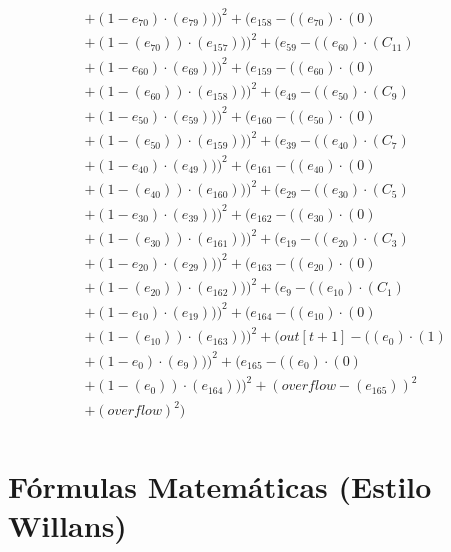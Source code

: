 \documentclass[10pt, a4paper]{article}
\begin{document}
\begin{small}
\begin{align*}
& + (1 - e_{70})  \cdot  (e_{79})))^{2} + (e_{158} - ((e_{70}) \cdot (0) \\
& + (1 - (e_{70})) \cdot (e_{157})))^{2} + (e_{59} - ((e_{60})  \cdot  (C_{11}) \\
& + (1 - e_{60})  \cdot  (e_{69})))^{2} + (e_{159} - ((e_{60}) \cdot (0) \\
& + (1 - (e_{60})) \cdot (e_{158})))^{2} + (e_{49} - ((e_{50})  \cdot  (C_{9}) \\
& + (1 - e_{50})  \cdot  (e_{59})))^{2} + (e_{160} - ((e_{50}) \cdot (0) \\
& + (1 - (e_{50})) \cdot (e_{159})))^{2} + (e_{39} - ((e_{40})  \cdot  (C_{7}) \\
& + (1 - e_{40})  \cdot  (e_{49})))^{2} + (e_{161} - ((e_{40}) \cdot (0) \\
& + (1 - (e_{40})) \cdot (e_{160})))^{2} + (e_{29} - ((e_{30})  \cdot  (C_{5}) \\
& + (1 - e_{30})  \cdot  (e_{39})))^{2} + (e_{162} - ((e_{30}) \cdot (0) \\
& + (1 - (e_{30})) \cdot (e_{161})))^{2} + (e_{19} - ((e_{20})  \cdot  (C_{3}) \\
& + (1 - e_{20})  \cdot  (e_{29})))^{2} + (e_{163} - ((e_{20}) \cdot (0) \\
& + (1 - (e_{20})) \cdot (e_{162})))^{2} + (e_{9} - ((e_{10})  \cdot  (C_{1}) \\
& + (1 - e_{10})  \cdot  (e_{19})))^{2} + (e_{164} - ((e_{10}) \cdot (0) \\
& + (1 - (e_{10})) \cdot (e_{163})))^{2} + (out[t+1] - ((e_{0})  \cdot  (1) \\
& + (1 - e_{0})  \cdot  (e_{9})))^{2} + (e_{165} - ((e_{0}) \cdot (0) \\
& + (1 - (e_{0})) \cdot (e_{164})))^{2} + (overflow - (e_{165}))^{2} \\
& + (overflow)^{2}) \\
\end{align*}
\end{small}\part{Fórmulas Matemáticas (Estilo Willans)}
\end{document}
